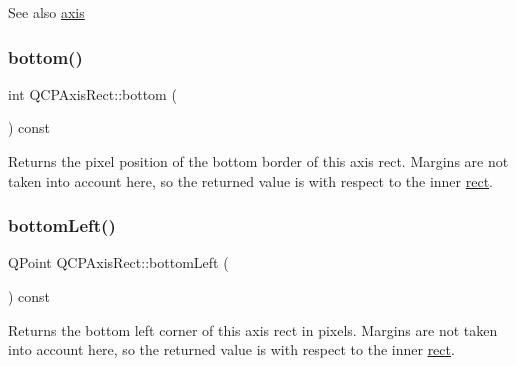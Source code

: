 \begin{DoxySeeAlso}{See also}
\mbox{\hyperlink{class_q_c_p_axis_rect_a583ae4f6d78b601b732183f6cabecbe1}{axis}} 
\end{DoxySeeAlso}
\mbox{\label{class_q_c_p_axis_rect_acefdf1abaa8a8ab681e906cc2be9581e}} 
\subsubsection{\texorpdfstring{bottom()}{bottom()}}
{\footnotesize\ttfamily int Q\+C\+P\+Axis\+Rect\+::bottom (\begin{DoxyParamCaption}{ }\end{DoxyParamCaption}) const\hspace{0.3cm}{\ttfamily [inline]}}

Returns the pixel position of the bottom border of this axis rect. Margins are not taken into account here, so the returned value is with respect to the inner \mbox{\hyperlink{class_q_c_p_layout_element_a208effccfe2cca4a0eaf9393e60f2dd4}{rect}}. \mbox{\label{class_q_c_p_axis_rect_ab15d4311d6535ccd7af504dc0e2b98c6}} 
\subsubsection{\texorpdfstring{bottom\+Left()}{bottomLeft()}}
{\footnotesize\ttfamily Q\+Point Q\+C\+P\+Axis\+Rect\+::bottom\+Left (\begin{DoxyParamCaption}{ }\end{DoxyParamCaption}) const\hspace{0.3cm}{\ttfamily [inline]}}

Returns the bottom left corner of this axis rect in pixels. Margins are not taken into account here, so the returned value is with respect to the inner \mbox{\hyperlink{class_q_c_p_layout_element_a208effccfe2cca4a0eaf9393e60f2dd4}{rect}}. \mbox{\label{class_q_c_p_axis_rect_a36dac884ec8fa3a3a2f3842ca7b7d32d}} 
